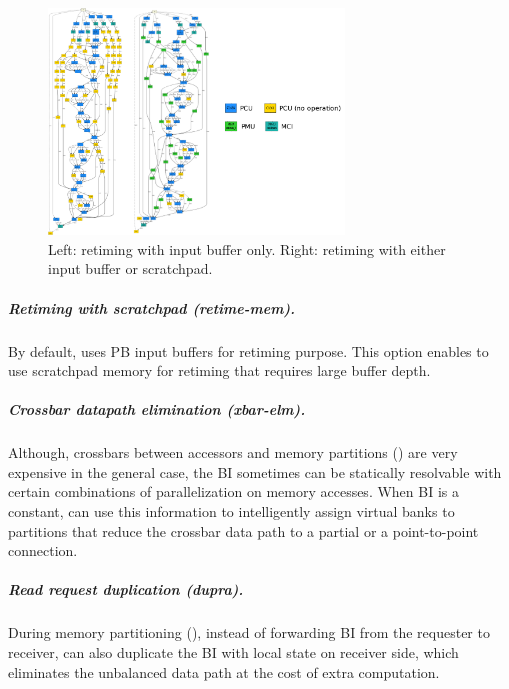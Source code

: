 \begin{figure}
\centering
\includegraphics[width=0.7\textwidth]{figs/retiming.pdf}
\caption[Retiming]{
  Left: retiming with input buffer only. Right: retiming with either input buffer or scratchpad.
}
\label{fig:mlp}
\end{figure}
\subparagraph{Retiming with scratchpad (retime-mem).} By default, \name{} uses PB input buffers for retiming purpose. 
This option enables \name{} to use scratchpad memory for retiming that requires large buffer depth.

\subparagraph{Crossbar datapath elimination (xbar-elm).}
Although, crossbars between accessors and memory partitions () are very expensive in the general case, the BI sometimes can be statically resolvable with certain combinations of parallelization on memory accesses. 
When BI is a constant, \name{} can use this information to intelligently assign virtual banks to partitions that reduce the crossbar data path to a partial or a point-to-point connection.

\subparagraph{Read request duplication (dupra).} During memory partitioning (), instead of forwarding BI from the requester to receiver, \name{} can also duplicate the BI with local state on receiver side, which
eliminates the unbalanced data path at the cost of extra computation.

